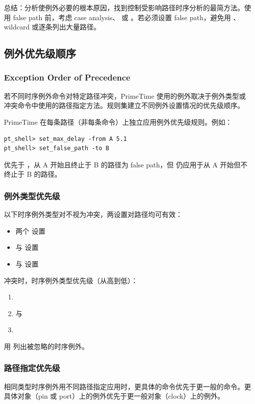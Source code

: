 总结：分析使例外必要的根本原因，找到控制受影响路径时序分析的最简方法。使用 false path 前，考虑 case analysis、 或 。若必须设置 false path，避免用 、wildcard 或逐条列出大量路径。

\subsection{例外优先级顺序}
\subsubsection*{Exception Order of Precedence}

若不同时序例外命令对特定路径冲突，PrimeTime 使用的例外取决于例外类型或冲突命令中使用的路径指定方法。规则集建立不同例外设置情况的优先级顺序。

PrimeTime 在每条路径（非每条命令）上独立应用例外优先级规则。例如：
\begin{lstlisting}
pt_shell> set_max_delay -from A 5.1
pt_shell> set_false_path -to B
\end{lstlisting}
 优先于 ，从 A 开始且终止于 B 的路径为 false path，但  仍应用于从 A 开始但不终止于 B 的路径。

\subsubsection{例外类型优先级}
以下时序例外类型对不视为冲突，两设置对路径均可有效：
\begin{itemize}
  \item 两个  设置
  \item {} 与  设置
  \item {} 与  设置
\end{itemize}

冲突时，时序例外类型优先级（从高到低）：
\begin{enumerate}
  \item {}
  \item {} 与 
  \item {}
\end{enumerate}

用  列出被忽略的时序例外。

\subsubsection{路径指定优先级}
相同类型时序例外用不同路径指定应用时，更具体的命令优先于更一般的命令。更具体对象（pin 或 port）上的例外优先于更一般对象（clock）上的例外。

